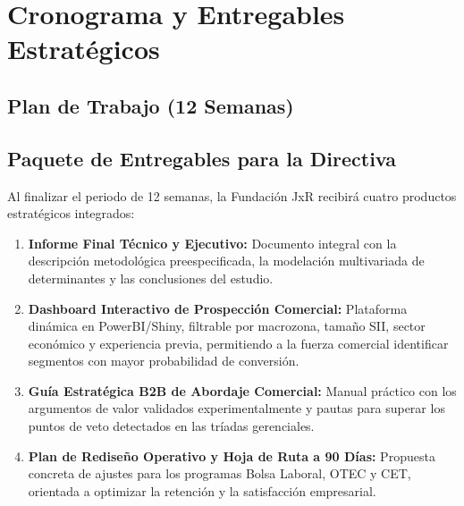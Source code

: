 \section{Cronograma y Entregables Estratégicos}

\subsection{Plan de Trabajo (12 Semanas)}

\begin{table}[h]
\centering
\caption{Carta Gantt Sintética del Proyecto JxR}
\vspace{0.2cm}
\small
{}
\end{table}

\subsection{Paquete de Entregables para la Directiva}

Al finalizar el periodo de 12 semanas, la Fundación JxR recibirá cuatro productos estratégicos integrados:

\begin{enumerate}
    \item \textbf{Informe Final Técnico y Ejecutivo:} Documento integral con la descripción metodológica preespecificada, la modelación multivariada de determinantes y las conclusiones del estudio.
    \item \textbf{Dashboard Interactivo de Prospección Comercial:} Plataforma dinámica en PowerBI/Shiny, filtrable por macrozona, tamaño SII, sector económico y experiencia previa, permitiendo a la fuerza comercial identificar segmentos con mayor probabilidad de conversión.
    \item \textbf{Guía Estratégica B2B de Abordaje Comercial:} Manual práctico con los argumentos de valor validados experimentalmente y pautas para superar los puntos de veto detectados en las tríadas gerenciales.
    \item \textbf{Plan de Rediseño Operativo y Hoja de Ruta a 90 Días:} Propuesta concreta de ajustes para los programas Bolsa Laboral, OTEC y CET, orientada a optimizar la retención y la satisfacción empresarial.
\end{enumerate}